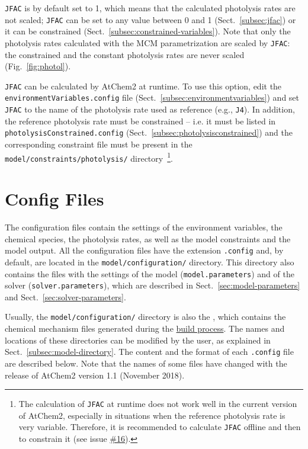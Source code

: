 \texttt{JFAC} is by default set to 1, which means that the calculated
photolysis rates are not scaled; \texttt{JFAC} can be set to any value
between 0 and 1 (Sect.~\ref{subsec:jfac}) or it can be constrained
(Sect.~\ref{subsec:constrained-variables}). Note that only the
photolysis rates calculated with the MCM parametrization are scaled by
\texttt{JFAC}: the constrained and the constant photolysis rates are
never scaled (Fig.~\ref{fig:photol}).

\texttt{JFAC} can be calculated by AtChem2 at runtime. To use this
option, edit the \texttt{environmentVariables.config} file
(Sect.~\ref{subsec:environmentvariables}) and set \texttt{JFAC} to the
name of the photolysis rate used as reference (e.g., \texttt{J4}). In
addition, the reference photolysis rate must be constrained -- i.e.
it must be listed in \texttt{photolysisConstrained.config}
(Sect.~\ref{subsec:photolysisconstrained}) and the corresponding
constraint file must be present in the
\texttt{model/constraints/photolysis/} directory~\footnote{The
  calculation of \texttt{JFAC} at runtime does not work well in the
  current version of AtChem2, especially in situations when the
  reference photolysis rate is very variable. Therefore, it is
  recommended to calculate \texttt{JFAC} offline and then to constrain it
  (see issue \href{https://github.com/AtChem/AtChem2/issues/16}{\#16}).}.

\section{Config Files} \label{sec:config-files}

The configuration files contain the settings of the environment
variables, the chemical species, the photolysis rates, as well as the
model constraints and the model output. All the configuration files
have the extension \texttt{.config} and, by default, are located in
the \texttt{model/configuration/} directory. This directory also
contains the files with the settings of the model
(\texttt{model.parameters}) and of the solver
(\texttt{solver.parameters}), which are described in
Sect.~\ref{sec:model-parameters} and Sect.~\ref{sec:solver-parameters}.

Usually, the \texttt{model/configuration/} directory is also the
\sharedir, which contains the chemical mechanism files generated
during the \hyperref[subsec:build-process]{build process}. The names
and locations of these directories can be modified by the user, as
explained in Sect.~\ref{subsec:model-directory}. The content and the
format of each \texttt{.config} file are described below. Note that
the names of some files have changed with the release of AtChem2
version 1.1 (November 2018).

